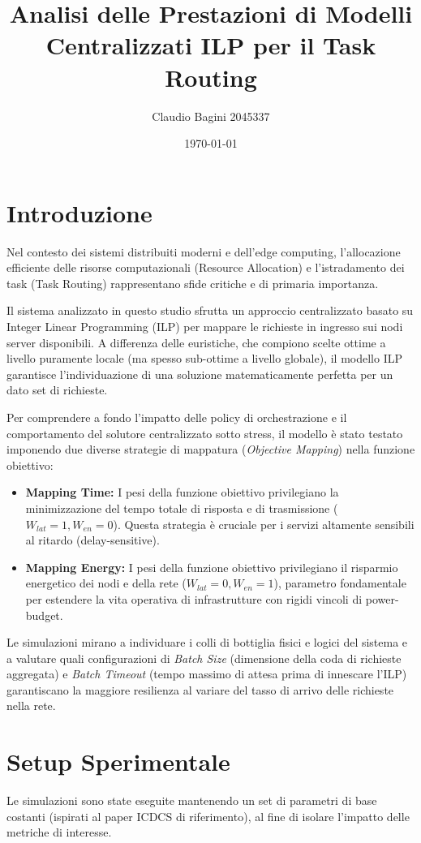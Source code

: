 \documentclass[11pt,a4paper]{article}
\title{\textbf{Analisi delle Prestazioni di Modelli Centralizzati ILP per il Task Routing}}
\author{Claudio Bagini 2045337}
\date{\today}
\begin{document}
\maketitle

\section{Introduzione}
Nel contesto dei sistemi distribuiti moderni e dell'edge computing, l'allocazione efficiente delle risorse computazionali (Resource Allocation) e l'istradamento dei task (Task Routing) rappresentano sfide critiche e di primaria importanza. 

Il sistema analizzato in questo studio sfrutta un approccio centralizzato basato su Integer Linear Programming (ILP) per mappare le richieste in ingresso sui nodi server disponibili. A differenza delle euristiche, che compiono scelte ottime a livello puramente locale (ma spesso sub-ottime a livello globale), il modello ILP garantisce l'individuazione di una soluzione matematicamente perfetta per un dato set di richieste.

Per comprendere a fondo l'impatto delle policy di orchestrazione e il comportamento del solutore centralizzato sotto stress, il modello è stato testato imponendo due diverse strategie di mappatura (\textit{Objective Mapping}) nella funzione obiettivo:
\begin{itemize}
    \item \textbf{Mapping Time:} I pesi della funzione obiettivo privilegiano la minimizzazione del tempo totale di risposta e di trasmissione ($W_{lat}=1, W_{en}=0$). Questa strategia è cruciale per i servizi altamente sensibili al ritardo (delay-sensitive).
    \item \textbf{Mapping Energy:} I pesi della funzione obiettivo privilegiano il risparmio energetico dei nodi e della rete ($W_{lat}=0, W_{en}=1$), parametro fondamentale per estendere la vita operativa di infrastrutture con rigidi vincoli di power-budget.
\end{itemize}
Le simulazioni mirano a individuare i colli di bottiglia fisici e logici del sistema e a valutare quali configurazioni di \textit{Batch Size} (dimensione della coda di richieste aggregata) e \textit{Batch Timeout} (tempo massimo di attesa prima di innescare l'ILP) garantiscano la maggiore resilienza al variare del tasso di arrivo delle richieste nella rete.

\section{Setup Sperimentale}
Le simulazioni sono state eseguite mantenendo un set di parametri di base costanti (ispirati al paper ICDCS di riferimento), al fine di isolare l'impatto delle metriche di interesse.
\end{document}
